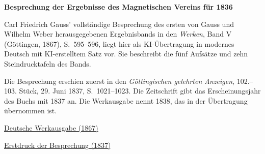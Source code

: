 \clearpage
\thispagestyle{empty}
\begin{center}\Large\textbf{Besprechung der Ergebnisse des Magnetischen Vereins für 1836}\end{center}

Carl Friedrich Gauss’ vollständige Besprechung des ersten von Gauss und Wilhelm Weber herausgegebenen Ergebnisbands in den \textit{Werken}, Band V (Göttingen, 1867), S.~595--596, liegt hier als KI-Übertragung in modernes Deutsch mit KI-erstelltem Satz vor. Sie beschreibt die fünf Aufsätze und zehn Steindrucktafeln des Bands.

Die Besprechung erschien zuerst in den \textit{Göttingischen gelehrten Anzeigen}, 102.--103. Stück, 29. Juni 1837, S.~1021--1023. Die Zeitschrift gibt das Erscheinungsjahr des Buchs mit 1837 an. Die Werkausgabe nennt 1838, das in der Übertragung übernommen ist.

\medskip\noindent
\href{https://gdz.sub.uni-goettingen.de/id/PPN236006339}{Deutsche Werkausgabe (1867)}\par
\noindent\href{https://gdz.sub.uni-goettingen.de/id/PPN385030444_1837_1}{Erstdruck der Besprechung (1837)}
\clearpage
